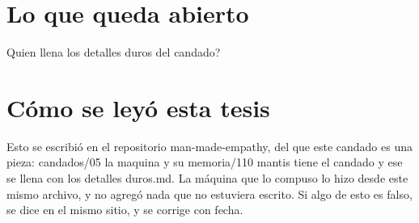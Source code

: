 \documentclass[11pt,a4paper]{article}
\begin{document}
\section{Lo que queda abierto}
\textquestiondown{}Quien llena los detalles duros del candado?

\section*{Cómo se leyó esta tesis}
Esto se escribió en el repositorio man-made-empathy, del que este candado es una pieza: candados/05 la maquina y su memoria/110 mantis tiene el candado y ese se llena con los detalles duros.md. La máquina que lo compuso lo hizo desde este mismo archivo, y no agregó nada que no estuviera escrito. Si algo de esto es falso, se dice en el mismo sitio, y se corrige con fecha.
\end{document}
